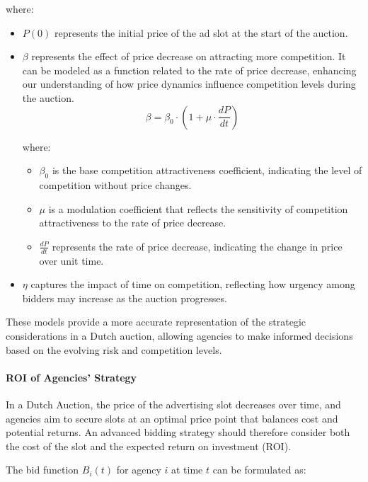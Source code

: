 where:
\begin{itemize}
    \item \( P(0) \) represents the initial price of the ad slot at the start of the auction.
    \item \( \beta \) represents the effect of price decrease on attracting more competition. It can be modeled as a function related to the rate of price decrease, enhancing our understanding of how price dynamics influence competition levels during the auction.
    \begin{equation}
\beta = \beta_0 \cdot \left(1 + \mu \cdot \frac{dP}{dt}\right)
\end{equation}

where:
\begin{itemize}
    \item \( \beta_0 \) is the base competition attractiveness coefficient, indicating the level of competition without price changes.
    \item \( \mu \) is a modulation coefficient that reflects the sensitivity of competition attractiveness to the rate of price decrease.
    \item \( \frac{dP}{dt} \) represents the rate of price decrease, indicating the change in price over unit time.
\end{itemize}

    \item \( \eta \) captures the impact of time on competition, reflecting how urgency among bidders may increase as the auction progresses.
\end{itemize}

These models provide a more accurate representation of the strategic considerations in a Dutch auction, allowing agencies to make informed decisions based on the evolving risk and competition levels.


\paragraph{ROI of Agencies' Strategy}

In a Dutch Auction, the price of the advertising slot decreases over time, and agencies aim to secure slots at an optimal price point that balances cost and potential returns. An advanced bidding strategy should therefore consider both the cost of the slot and the expected return on investment (ROI).

The bid function \( B_i(t) \) for agency \( i \) at time \( t \) can be formulated as:

